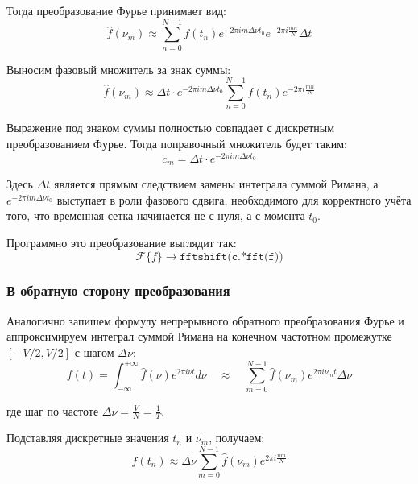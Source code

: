 \documentclass[a4paper, 12pt]{article}
\begin{document}
Тогда преобразование Фурье принимает вид:
\begin{equation*}
    \hat{f}(\nu_m) \approx \sum_{n=0}^{N-1} f(t_n) e^{-2\pi i m\Delta \nu t_0} e^{-2\pi i \frac{mn}{N}} \Delta t
\end{equation*}

Выносим фазовый множитель за знак суммы:
\begin{equation*}
    \hat{f}(\nu_m) \approx \Delta t \cdot e^{-2\pi i m\Delta \nu t_0} \sum_{n=0}^{N-1} f(t_n) e^{-2\pi i \frac{mn}{N}}
\end{equation*}

Выражение под знаком суммы полностью совпадает с дискретным преобразованием Фурье. Тогда поправочный множитель будет таким:
\begin{equation*}
    c_m = \Delta t \cdot e^{-2\pi i m\Delta \nu t_0}
\end{equation*}

Здесь $\Delta t$ является прямым следствием замены интеграла суммой Римана, а $e^{-2\pi i m\Delta \nu t_0}$ выступает в роли фазового сдвига, необходимого для корректного учёта того, что временная сетка начинается не с нуля, а с момента $t_0$.

Программно это преобразование выглядит так:
\begin{equation*}
    \mathcal{F}\{f\} \rightarrow \texttt{fftshift(c.*fft(f))}
\end{equation*}
\subsubsection*{В обратную сторону преобразования}

Аналогично запишем формулу непрерывного обратного преобразования Фурье и аппроксимируем интеграл суммой Римана на конечном частотном промежутке $[-V/2, V/2]$ с шагом $\Delta \nu$:
\begin{equation*}
    f(t) = \int_{-\infty}^{+\infty} \hat{f}(\nu)e^{2\pi i \nu t} d\nu \quad \approx \quad \sum_{m=0}^{N-1} \hat{f}(\nu_m)e^{2\pi i \nu_m t} \Delta \nu
\end{equation*}

где шаг по частоте $\Delta \nu = \frac{V}{N} = \frac{1}{T}$.

Подставляя дискретные значения $t_n$ и $\nu_m$, получаем:
\begin{equation*}
    f(t_n) \approx \Delta \nu \sum_{m=0}^{N-1} \hat{f}(\nu_m)e^{2\pi i \frac{nm}{N}}
\end{equation*}
\end{document}
